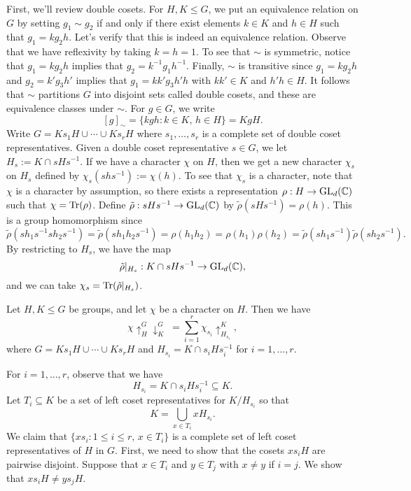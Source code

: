 First, we'll review double cosets. For $H, K \leq G$, we put an equivalence 
relation on $G$ by setting $g_1 \sim g_2$ if and only if there exist elements
$k \in K$ and $h \in H$ such that $g_1 = kg_2h$. Let's verify that this is 
indeed an equivalence relation. Observe that we have reflexivity by 
taking $k = h = 1$. To see that $\sim$ is symmetric, notice that $g_1 = 
kg_2h$ implies that $g_2 = k^{-1}g_1h^{-1}$. Finally, $\sim$ is transitive 
since $g_1 = kg_2h$ and $g_2 = k'g_3h'$ implies that $g_1 = kk'g_3h'h$ with 
$kk' \in K$ and $h'h \in H$. It follows that $\sim$ partitions $G$ 
into disjoint sets called double cosets, and these are equivalence classes 
under $\sim$. For $g \in G$, we write 
\[ [g]_{\sim} = \{kgh : k\in K,\, h\in H\} = KgH. \] 
Write $G = Ks_1H \cup \cdots \cup Ks_rH$ where $s_1, \dots, s_r$ is a 
complete set of double coset representatives. Given a double coset 
representative $s \in G$, we let $H_s := K \cap sHs^{-1}$. If we have a 
character $\chi$ on $H$, then we get a new character $\chi_s$ on $H_s$ 
defined by $\chi_s(shs^{-1}) := \chi(h)$. To see that $\chi_s$ is a 
character, note that $\chi$ is a character by assumption, so there 
exists a representation $\rho : H \to \operatorname{GL}_d(\mathbb{C})$ such that $\chi = \operatorname{Tr}(\rho)$. 
Define $\tilde\rho : sHs^{-1} \to \operatorname{GL}_d(\mathbb{C})$ by $\tilde\rho(sHs^{-1}) = 
\rho(h)$. This is a group homomorphism since 
\[ \tilde\rho(sh_1s^{-1}sh_2s^{-1}) = \tilde\rho(sh_1h_2s^{-1}) = 
\rho(h_1h_2) = \rho(h_1)\rho(h_2) = \tilde\rho(sh_1s^{-1})\tilde\rho(sh_2s^{-1}). \] 
By restricting to $H_s$, we have the map 
\[ \tilde\rho|_{H_s} : K \cap sHs^{-1} \to \operatorname{GL}_d(\mathbb{C}), \] 
and we can take $\chi_s = \operatorname{Tr}(\tilde\rho|_{H_s})$. 

\begin{theo}{}
    Let $H, K \leq G$ be groups, and let $\chi$ be a character on $H$. Then 
    we have 
    \[ \chi \uparrow_H^G \downarrow_K^G \;= \sum_{i=1}^r \chi_{s_i} \uparrow_{H_{s_i}}^K, \] 
    where $G = Ks_1H \cup \cdots \cup Ks_rH$ and $H_{s_i} = K \cap s_iHs_i^{-1}$ for $i = 1, \dots, r$. 
\end{theo}

For $i = 1, \dots, r$, observe that we have 
\[ H_{s_i} = K \cap s_iHs_i^{-1} \subseteq K. \] 
Let $T_i \subseteq K$ be a set of left coset representatives for $K/H_{s_i}$ so that 
\[ K = \bigcup_{x \in T_i} xH_{s_i}. \] 
We claim that $\{xs_i : 1 \leq i \leq r,\, x \in T_i\}$ is a complete set 
of left coset representatives of $H$ in $G$. First, we need to show that 
the cosets $xs_iH$ are pairwise disjoint. Suppose that $x \in T_i$ and 
$y \in T_j$ with $x \neq y$ if $i = j$. We show that $xs_iH \neq ys_jH$. 

